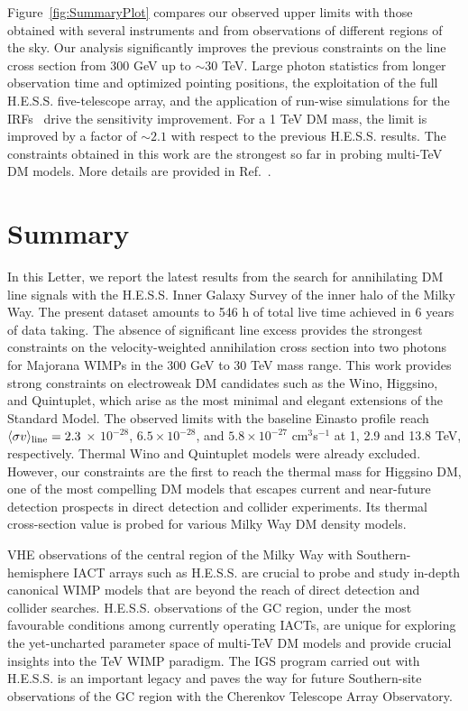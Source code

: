 \documentclass[aps,prl,twocolumn,floats,balancelastpage,showpacs,showkeys,preprintnumbers,floatfix,nofootinbib,superscriptaddress, longbibliography]{revtex4-1}
\begin{document}
Figure~\ref{fig:SummaryPlot} compares our observed upper limits with those obtained with several instruments and from observations of different regions of the sky. Our analysis significantly improves the previous constraints on the line cross section from 300 GeV up to $\sim 30$ TeV. Large photon statistics from longer observation time and optimized pointing positions, the exploitation of the full H.E.S.S. five-telescope array, and the application of run-wise simulations for the IRFs~\cite{Holler:2020duc} drive the sensitivity improvement. For a 1 TeV DM mass, the limit is improved by a factor of $\sim 2.1$ with respect to the previous H.E.S.S. results. The constraints obtained in this work are the strongest so far in probing multi-TeV DM models. More details are provided in Ref.~\cite{supplement_more_details}.


\section{Summary}
In this Letter, we report the latest results from the search for annihilating DM line signals with the H.E.S.S. Inner Galaxy Survey of the inner halo of the Milky Way.
The present dataset amounts to 546 h of total live time achieved in 6 years of data taking. The absence of significant line excess provides the strongest constraints on the velocity-weighted annihilation cross section into two photons for Majorana WIMPs in the 300 GeV to 30 TeV mass range. This work provides strong constraints on electroweak DM candidates such as the Wino, Higgsino, and Quintuplet, which arise as the most
minimal and elegant extensions of the Standard Model. The observed limits with the baseline Einasto profile reach $\langle \sigma v \rangle_{\rm line} = 2.3$ $\times$ $10^{-28}$, $6.5 \times 10^{-28}$, and $5.8 \times 10^{-27}$ cm$^3$s$^{-1}$ at 1, 2.9 and 13.8 TeV, respectively. Thermal Wino and Quintuplet models were already excluded.
However, our constraints
are the first to reach the thermal mass for Higgsino DM, one of the most compelling DM models that escapes current and near-future detection prospects in direct detection and collider experiments.
Its thermal cross-section value is probed for various Milky Way DM density models.

VHE observations of the central region of the Milky Way with Southern-hemisphere IACT arrays such as H.E.S.S. are crucial to probe and study in-depth canonical WIMP models that are beyond the reach of direct detection and collider searches. H.E.S.S. observations of the GC region, under the most favourable conditions among currently operating IACTs, are unique for exploring the yet-uncharted parameter space of multi-TeV DM models and provide crucial insights into the TeV WIMP paradigm. The IGS program carried out with H.E.S.S. is an important legacy and paves the way for future Southern-site observations of the GC region with the Cherenkov Telescope Array Observatory.
\end{document}
